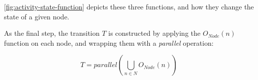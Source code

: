 \autoref{fig:activity-state-function} depicts these three functions, and how they change the state of a given node.

\fi

As the final step, the transition \(T\) is constructed by applying the \(O_\mathit{Node}(n)\) function on each node, and wrapping them with a \emph{parallel} operation:

\begin{equation*}
	T = \mathit{parallel}\left( \bigcup_{n \in N} O_\mathit{Node}(n) \right)
\end{equation*}
